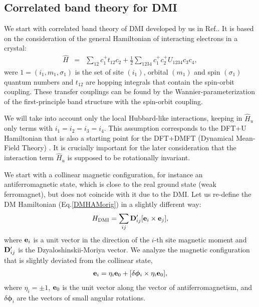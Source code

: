 \documentclass[aps,prl,twocolumn,showpacs,amsmath,amssymb]{revtex4-1}
\begin{document}
\subsection{Correlated band theory for DMI}
We start with correlated band theory of DMI developed by us in Ref.\cite{correlatedDMI}.
It is based on the consideration of the general Hamiltonian of interacting electrons in
a crystal:
\begin{eqnarray}
\hat H &=&  \sum_{12} c^{+}_{1} t_{12} c_{2} + \frac{1}{2} \sum_{1234} c^{+}_{1} c^{+}_{2} U_{1234} c_{3} c_{4},
\label{Ham1}
\end{eqnarray}
were $1=(i_1,m_1,\sigma_1)$ is the set of site $(i_1)$, orbital
$(m_1)$ and spin $(\sigma_1)$ quantum numbers and $t_{12}$ are
hopping integrals that contain the spin-orbit coupling. These transfer couplings can be found by the
Wannier-parameterization of the first-principle band structure with
the spin-orbit coupling.

We will take into account only the local Hubbard-like interactions,
keeping in $\hat H_{u}$ only terms with $i_1=i_2=i_3=i_4$. This
assumption corresponds to the DFT+U Hamiltonian \cite{LDAU} that
is also a starting point for the DFT+DMFT (Dynamical Mean-Field
Theory) \cite{LDA+DMFT,kotliar-DMFT, Anisimov}. It is crucially important
for the later consideration that the interaction term $\hat H_{u}$
is supposed to be rotationally invariant.

We start with a collinear magnetic configuration, for instance an antiferromagnetic state, which is close to the real ground
state (weak ferromagnet), but does not coincide with it due to the DMI. 
Let us re-define the DM Hamiltonian (Eq.\ref{DMHAMorig}) in a slightly different way:
\begin{eqnarray}
H_{\rm DMI}=\sum_{ij} {\bf D}^{\prime}_{ij} [{\bf e}_{i} \times {\bf e}_{j} ],
\label{DMHAM}
\end{eqnarray}
where ${\bf e}_{i}$ is a unit vector in the direction of the $i$-th
site magnetic moment and ${\bf D}^{\prime}_{ij}$ is the
Dzyaloshinskii-Moriya vector. We analyze the magnetic
configuration that is slightly deviated from the collinear state,
\begin{eqnarray}
{\bf e}_{i} = \eta_{i} {\bf e}_{0} + [ \delta \boldsymbol{\phi}_{i}
\times  \eta_{i} {\bf e}_{0} ], \label{delta}
\end{eqnarray}
where $\eta_{i}=\pm 1$, ${\bf e}_{0}$ is the unit vector along the
vector of antiferromagnetism, and $ \delta \boldsymbol{\phi}_{i}$ are
the vectors of small angular rotations.
\end{document}
